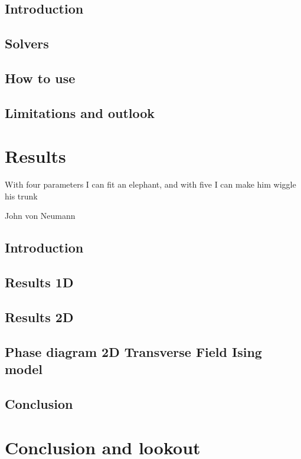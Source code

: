 \documentclass{book}
\newcounter{a}
\newcounter{b}
\begin{document}
\section{Introduction}


\section{Solvers} \label{sec:framework_impl}


\section{How to use}\label{sec:H5:source_code}


\section{Limitations and outlook}


\chapter{Results} \label{chap:results}

\epigraph{With four parameters I can fit an elephant, and with five I can make him wiggle his trunk}{John von Neumann}

%

\section{Introduction}


\section{Results 1D}\label{sec:results1d}


\section{Results 2D}\label{sec:results2d}


\section{Phase diagram 2D Transverse Field Ising model} \label{subsec:2dpahsediag}


\section{Conclusion}


\chapter{Conclusion and lookout}






\newpage
\clearpage{\thispagestyle{empty}\cleardoublepage}
\end{document}
